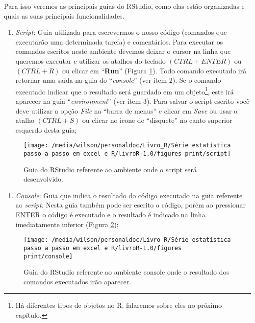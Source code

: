 \documentclass[14pt,titlepage, oneside, openany, a4paper]{book}
\providecommand{\tightlist}{%
  \setlength{\itemsep}{0pt}\setlength{\parskip}{0pt}}
\begin{document}
Para isso veremos as principais guias do RStudio, como elas estão organizadas e quais as suas principais funcionalidades.

\begin{enumerate}
\def\labelenumi{\arabic{enumi}.}
\tightlist
\item
  \emph{Script}: Guia utilizada para escrevermos o nosso código (comandos que executarão uma determinada tarefa) e comentários. Para executar os comandos escritos neste ambiente devemos deixar o cursor na linha que queremos executar e utilizar os atalhos do teclado \((CTRL + ENTER)\) ou \((CTRL + R)\) ou clicar em ``\textbf{Run}'' (Figura \ref{fig:script}). Todo comando executado irá retornar uma saída na guia do ``\emph{console}'' (ver item 2). Se o comando executado indicar que o resultado será guardado em um objeto\footnote{Há diferentes tipos de objetos no R, falaremos sobre eles no próximo capítulo.}, este irá aparecer na guia ``\emph{environment}'' (ver item 3). Para salvar o script escrito você deve utilizar a opção \emph{File} na ``barra de menus'' e clicar em \emph{Save} ou usar o atalho \((CTRL + S)\) ou clicar no icone de ``disquete'' no canto superior esquerdo desta guia;
\end{enumerate}

\begin{figure}[H]

{\centering \texttt{[image: /media/wilson/personaldoc/Livro\_R/Série estatística passo a passo em excel e R/livroR-1.0/figures print/script]} 

}

\caption{Guia do RStudio referente ao ambiente onde o script será desenvolvido.}\label{fig:script}
\end{figure}

\begin{enumerate}
\def\labelenumi{\arabic{enumi}.}
\setcounter{enumi}{1}
\tightlist
\item
  \emph{Console}: Guia que indica o resultado do código executado na guia referente ao \emph{script}. Nesta guia também pode ser escrito o código, porém ao pressionar ENTER o código é executado e o resultado é indicado na linha imediatamente inferior (Figura \ref{fig:console});
\end{enumerate}

\begin{figure}[H]

{\centering \texttt{[image: /media/wilson/personaldoc/Livro\_R/Série estatística passo a passo em excel e R/livroR-1.0/figures print/console]} 

}

\caption{Guia do RStudio referente ao ambiente console onde o resultado dos comandos executados irão aparecer.}\label{fig:console}
\end{figure}
\end{document}
